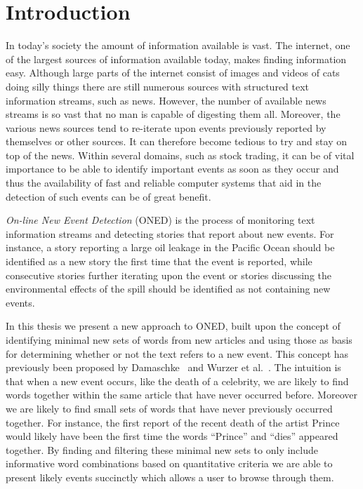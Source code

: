 \chapter{Introduction}
\label{chapter:introduction}
In today's society the amount of information available is vast. The internet, one of the largest sources of information available today, makes finding information easy. Although large parts of the internet consist of images and videos of cats doing silly things there are still numerous sources with structured text information streams, such as news. However, the number of available news streams is so vast that no man is capable of digesting them all. Moreover, the various news sources tend to re-iterate upon events previously reported by themselves or other sources. It can therefore become tedious to try and stay on top of the news. 
Within several domains, such as stock trading, it can be of vital importance to be able to identify important events as soon as they occur and thus the availability of fast and reliable computer systems that aid in the detection of such events can be of great benefit. 

\emph{On-line New Event Detection} (ONED) is the process of monitoring text information streams and detecting stories that report about new events. For instance, a story reporting a large oil leakage in the Pacific Ocean should be identified as a new story the first time that the event is reported, while consecutive stories further iterating upon the event or stories discussing the environmental effects of the spill should be identified as not containing new events. 

In this thesis we present a new approach to ONED, built upon the concept of identifying minimal new sets of words from new articles and using those as basis for determining whether or not the text refers to a new event. This concept has previously been proposed by Damaschke~\cite{damaschke2015pairs} and Wurzer et al.~\cite{wurzer2015kterm}. The intuition is that when a new event occurs, like the death of a celebrity, we are likely to find words together within the same article that have never occurred before. Moreover we are likely to find small sets of words that have never previously occurred together. For instance, the first report of the recent death of the artist Prince would likely have been the first time the words ``Prince'' and ``dies'' appeared together. By finding and filtering these minimal new sets to only include informative word combinations based on quantitative criteria we are able to present likely events succinctly which allows a user to browse through them.

